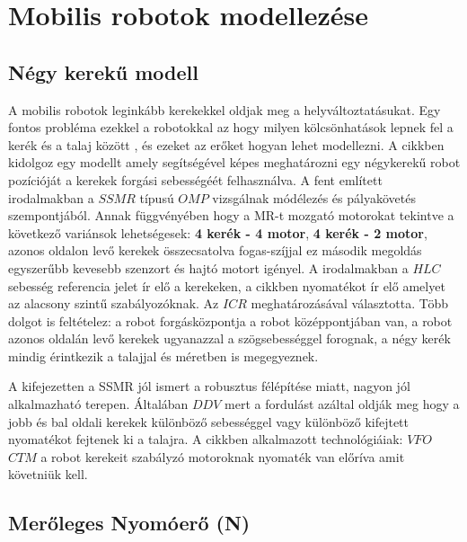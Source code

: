 

\section{Mobilis robotok modellezése} 

\subsection*{Négy kerekű modell}
A mobilis robotok leginkább kerekekkel oldjak meg a helyváltoztatásukat. Egy fontos probléma ezekkel a robotokkal az hogy milyen kölcsönhatások lepnek fel a kerék és a talaj között \cite{Torjancki4Mobilerobot} \cite{RobustMotionControl} \cite{Campa2014}, és ezeket az erőket hogyan lehet modellezni. A \cite{Torjancki4Mobilerobot} cikkben kidolgoz egy modellt amely segítségével képes meghatározni egy négykerekű robot pozícióját a kerekek forgási sebességéét felhasználva. A fent említett irodalmakban a $SSMR$  típusú $OMP$ vizsgálnak módélezés és pályakövetés szempontjából. Annak függvényében hogy a MR-t mozgató motorokat tekintve a következő variánsok lehetségesek: \textbf{4 kerék - 4 motor}, \textbf{4 kerék - 2 motor}, azonos oldalon levő kerekek összecsatolva fogas-szíjjal ez második megoldás egyszerűbb kevesebb szenzort és hajtó motort igényel.
A \cite{Torjancki4Mobilerobot} \cite{Campa2014} irodalmakban a $HLC$ sebesség referencia jelet ír elő a kerekeken, \cite{RobustMotionControl} a cikkben nyomatékot ír elő amelyet az alacsony szintű szabályozóknak.
Az $ICR$ meghatározásával választotta. Több dolgot is feltételez: a robot forgásközpontja a robot középpontjában van, a robot azonos oldalán levő kerekek ugyanazzal a szögsebességgel forognak, a négy kerék mindig érintkezik a talajjal és méretben is megegyeznek.

A \cite{RobustMotionControl} kifejezetten a SSMR  jól ismert a robusztus félépítése miatt, nagyon jól alkalmazható terepen. Általában $DDV$ mert a fordulást azáltal oldják meg hogy a jobb és bal oldali kerekek különböző sebességgel vagy különböző kifejtett nyomatékot fejtenek ki a talajra.
A \cite{RobustMotionControl} cikkben alkalmazott technológiáiak: $VFO$
$CTM$ a robot kerekeit szabályzó motoroknak nyomaték van előríva amit követniük kell.

\subsection{Merőleges Nyomóerő (N)} 

